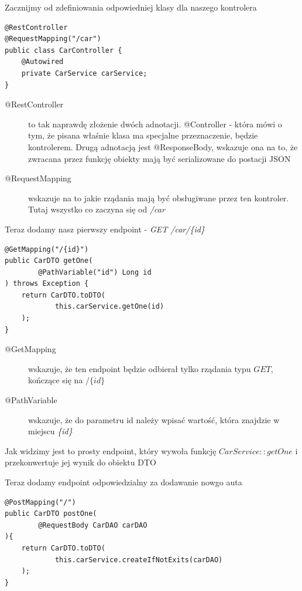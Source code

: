 \documentclass{article}
\begin{document}
                Zacznijmy od zdefiniowania odpowiedniej klasy dla naszego kontrolera
                \begin{verbatim}
@RestController
@RequestMapping("/car")
public class CarController { 
    @Autowired
    private CarService carService;
}
                \end{verbatim}
                \begin{description}
                    \item[@RestController] to tak naprawdę złożenie dwóch adnotacji. @Controller - która mówi o tym, że pisana właśnie klasa ma specjalne przeznaczenie, będzie kontrolerem. Drugą adnotacją jest @ResponseBody, wskazuje ona na to, że zwracana przez funkcję obiekty mają być serializowane do postacji JSON
                    \item[@RequestMapping] wskazuje na to jakie rządania mają być obsługiwane przez ten kontroler. Tutaj wszystko co zaczyna się od \emph{/car}
                \end{description}
                Teraz dodamy nasz pierwszy endpoint - \emph{GET /car/\{id\}}
                \begin{verbatim}
@GetMapping("/{id}")
public CarDTO getOne(
        @PathVariable("id") Long id
) throws Exception {
    return CarDTO.toDTO(
            this.carService.getOne(id)
    );
}                   
                \end{verbatim}
                \begin{description}
                    \item[@GetMapping] wskazuje, że ten endpoint będzie odbierał tylko rządania typu $GET$, kończące się na $/\{id\}$
                    \item[@PathVariable] wskazuje, że do parametru id należy wpisać wartość, która znajdzie w miejscu \emph{\{id\}}  
                \end{description}
                
                Jak widzimy jest to prosty endpoint, który wywoła funkcję $CarService::getOne$ i przekonwertuje jej wynik do obiektu DTO
                
                Teraz dodamy endpoint odpowiedzialny za dodawanie nowgo auta
                \begin{verbatim}
@PostMapping("/")
public CarDTO postOne(
        @RequestBody CarDAO carDAO
){
    return CarDTO.toDTO(
            this.carService.createIfNotExits(carDAO)
    );
}
                \end{verbatim}
                
\end{document}
